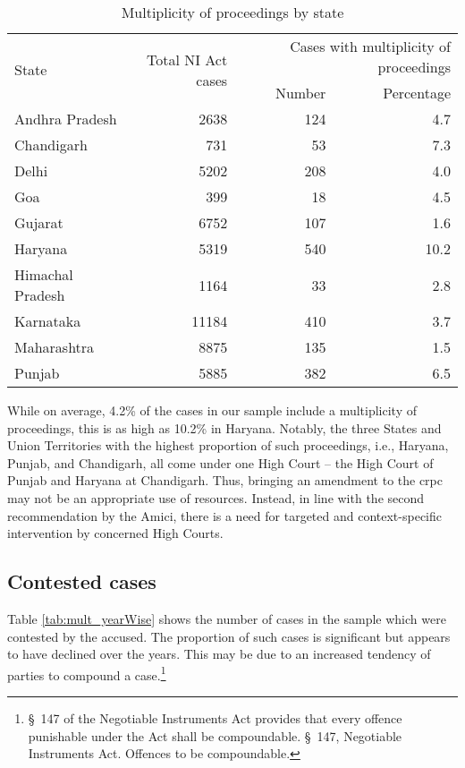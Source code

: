 \begin{longtable}{@{}lrrr@{}}
 \caption{Multiplicity of proceedings by state}\label{tab:state_multiplicity}\\
\toprule
 \multirow{2}{*}{State} & \multirow{2}{*}{Total NI Act cases} & \multicolumn{2}{p{4cm}}{Cases with multiplicity of proceedings} \\
 \cmidrule{3-4}
 & & Number & Percentage \\
\midrule
\endhead
Andhra Pradesh & 2638 & 124 & 4.7 \\
Chandigarh & 731 & 53 & 7.3 \\
Delhi & 5202 & 208 & 4.0 \\
Goa & 399 & 18 & 4.5 \\
Gujarat & 6752 & 107 & 1.6 \\
Haryana & 5319 & 540 & 10.2 \\
Himachal Pradesh & 1164 & 33 & 2.8 \\
Karnataka & 11184 & 410 & 3.7 \\
Maharashtra & 8875 & 135 & 1.5 \\
Punjab & 5885 & 382 & 6.5 \\
\bottomrule
\end{longtable}

While on average, 4.2\% of the cases in our sample include a multiplicity of proceedings, this is as high as 10.2\% in Haryana. Notably, the three States and Union Territories with the highest proportion of such proceedings, i.e., Haryana, Punjab, and Chandigarh, all come under one High Court -- the High Court of Punjab and Haryana at Chandigarh. Thus, bringing an amendment to the \gls{crpc} may not be an appropriate use of resources. Instead, in line with the second recommendation by the Amici, there is a need for targeted and context-specific intervention by concerned High Courts.

\subsection{Contested cases}
\label{sec:contested-cases}

Table \ref{tab:mult_yearWise} shows the number of cases in the sample which were contested by the accused. The proportion of such cases is significant but appears to have declined over the years. This may be due to an increased tendency of parties to compound a case.\footnote{\S~147 of the Negotiable Instruments Act provides that every offence punishable under the Act shall be compoundable. \S~147, Negotiable Instruments Act. Offences to be compoundable.}

